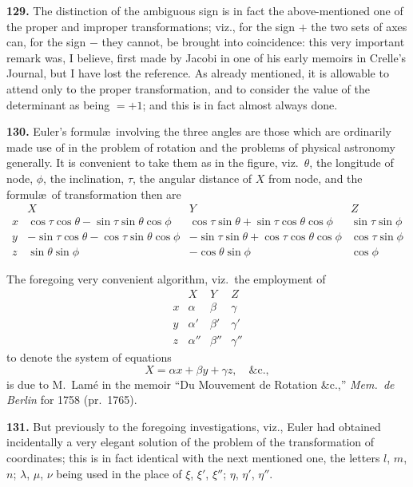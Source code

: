 \documentclass[11pt,a4paper]{book}
\begin{document}
\textbf{129.} The distinction of the ambiguous sign is in fact the above-mentioned one of the proper and improper transformations; viz., for the sign $+$ the two sets of axes can, for the sign $-$ they cannot, be brought into coincidence: this very important remark was, I believe, first made by Jacobi in one of his early memoirs in Crelle's Journal, but I have lost the reference. As already mentioned, it is allowable to attend only to the proper transformation, and to consider the value of the determinant as being $= +1$; and this is in fact almost always done.

\textbf{130.} Euler's formul\ae\ involving the three angles are those which are ordinarily made use of in the problem of rotation and the problems of physical astronomy generally. It is convenient to take them as in the figure, viz.\ $\theta$, the longitude of node, $\phi$, the inclination, $\tau$, the angular distance of $X$ from node, and the formul\ae\ of transformation then are
\[
\begin{array}{c|ccc}
& X & Y & Z \\ \hline
x & \cos\tau\cos\theta - \sin\tau\sin\theta\cos\phi & \cos\tau\sin\theta + \sin\tau\cos\theta\cos\phi & \sin\tau\sin\phi \\
y & -\sin\tau\cos\theta - \cos\tau\sin\theta\cos\phi & -\sin\tau\sin\theta + \cos\tau\cos\theta\cos\phi & \cos\tau\sin\phi \\
z & \sin\theta\sin\phi & -\cos\theta\sin\phi & \cos\phi
\end{array}
\]

The foregoing very convenient algorithm, viz.\ the employment of
\[
\begin{array}{c|ccc}
& X & Y & Z \\ \hline
x & \alpha & \beta & \gamma \\
y & \alpha' & \beta' & \gamma' \\
z & \alpha'' & \beta'' & \gamma''
\end{array}
\]
to denote the system of equations
\[
X = \alpha x + \beta y + \gamma z, \quad \&\text{c.},
\]
is due to M.~Lam\'e in the memoir ``Du Mouvement de Rotation \&c.,'' \textit{Mem.\ de Berlin} for 1758 (pr.~1765).

\textbf{131.} But previously to the foregoing investigations, viz., Euler had obtained incidentally a very elegant solution of the problem of the transformation of coordinates; this is in fact identical with the next mentioned one, the letters $l$, $m$, $n$; $\lambda$, $\mu$, $\nu$ being used in the place of $\xi$, $\xi'$, $\xi''$; $\eta$, $\eta'$, $\eta''$.
\end{document}
